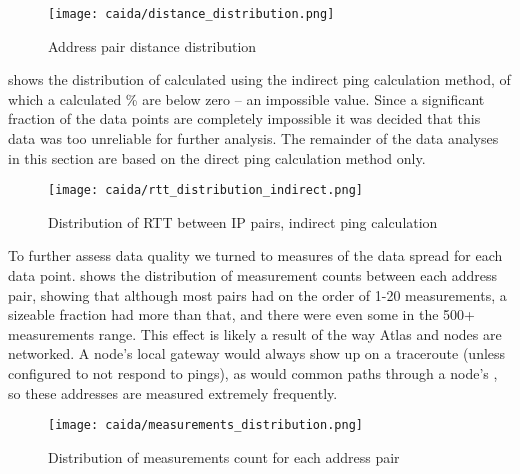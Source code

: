 \begin{figure}[htb]
    \centering
    \texttt{[image: caida/distance\_distribution.png]}
    \caption{Address pair distance distribution}
    \label{fig:caida_distance_distribution}
\end{figure}

  shows the distribution of \rtts calculated using the indirect ping calculation method, of which a calculated \% are below zero -- an impossible value. Since a significant fraction of the data points are completely impossible it was decided that this data was too unreliable for further analysis. The remainder of the data analyses in this section are based on the direct ping calculation method only.

\begin{figure}[htb]
    \centering
    \texttt{[image: caida/rtt\_distribution\_indirect.png]}
    \caption{Distribution of RTT between IP pairs, indirect ping calculation}
    \label{fig:caida_rtt_distribution_indirect}
\end{figure}

To further assess data quality we turned to measures of the data spread for each data point.  shows the distribution of measurement counts between each \ip address pair, showing that although most pairs had on the order of 1-20 measurements, a sizeable fraction had more than that, and there were even some in the 500+ measurements range. This effect is likely a result of the way \ripe Atlas and \caida nodes are networked. A node's local gateway would always show up on a traceroute (unless configured to not respond to pings), as would common paths through a node's \isp, so these \ip addresses are measured extremely frequently.

\begin{figure}[htb]
    \centering
    \texttt{[image: caida/measurements\_distribution.png]}
    \caption{Distribution of measurements count for each address pair}
    \label{fig:caida_measurements_distribution}
\end{figure}

